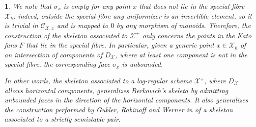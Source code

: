 \documentclass{amsart}%
\numberwithin{equation}{subsection}
\theoremstyle{plain2}
\theoremstyle{definition2}
\theoremstyle{stepstyle}
\theoremstyle{point}
\theoremstyle{subpoint}
\newtheorem{subpoint}[equation]{}%
\newcommand{\spa}[1]{\begin{subpoint}#1\end{subpoint}}           %
\newcommand{\cX}{\ensuremath{\mathscr{X}}}
\newcommand{\caC}{\ensuremath{\mathcal{C}}}
\begin{document}
\spa{ \label{rem points in kato fan and skeleton}
We note that $\sigma_x$ is empty for any point $x$ that does not lie in the special fibre $\cX_k$: indeed, outside the special fibre any uniformizer is an invertible element, so it is trivial in $\caC_{\cX,x}$ and is mapped to $0$ by any morphism of monoids. Therefore, the construction of the skeleton associated to $\cX^+$ only concerns the points in the Kato fans $F$ that lie in the special fibre. In particular, given a generic point $x \in \cX_k$ of an intersection of components of $D_\cX$, where at least one component is not in the special fibre, the corresponding face $\sigma_x$ is unbounded.

In other words, the skeleton associated to a log-regular scheme $\cX^+$, where $D_\cX$ allows horizontal components, generalizes Berkovich's skeleta by admitting unbounded faces in the direction of the horizontal components. It also generalizes the construction performed by Gubler, Rabinoff and Werner in \cite{GublerRabinoffWerner} of a skeleton associated to a strictly semistable pair.
}
 
\end{document}
